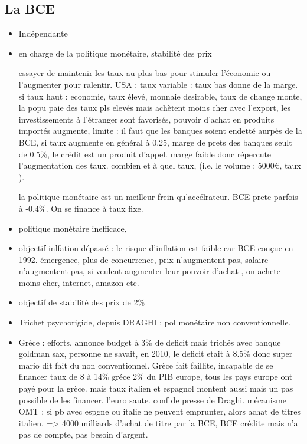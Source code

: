 \documentclass[a4paper,12pt]{article}
\begin{document}
\subsection{La BCE}

\begin{itemize}
	\item Indépendante
	\item en charge de la politique monétaire, stabilité des prix
	
	essayer de maintenir les taux au plus bas pour stimuler l'économie
	ou l'augmenter pour ralentir.
	USA : taux variable : taux bas donne de la marge.
	si taux haut : economie, taux élevé, monnaie desirable, taux de change monte,
	la popu paie des taux pls elevés mais achètent moins cher avec l'export, 
	les investissements à l'étranger sont favorisés, pouvoir d'achat en produits importés augmente,
	limite : il faut que les banques soient endetté aurpès de la BCE, si taux augmente en général à 0.25,
	marge de prets des banques seult de 0.5\%, le crédit est un produit d'appel. marge faible donc répercute
	l'augmentation des taux. combien et à quel taux, (i.e. le volume : 5000€, taux ).
	
	la politique monétaire est un meilleur frein qu'accélrateur. BCE prete parfois à -0.4\%.
	On se finance à taux fixe. 
	
	\item politique monétaire inefficace, 
	\item objectif inlfation dépassé : le risque d'inflation est faible car BCE conçue en 1992.
	émergence, plus de concurrence, prix n'augmentent pas, salaire n'augmentent pas, 
	si veulent augmenter leur pouvoir d'achat , on achete moins cher, internet, amazon etc.
	
	\item objectif de stabilité des prix de 2\%
	
	\item Trichet psychorigide, depuis DRAGHI ; pol monétaire non conventionnelle.
	
	\item Grèce : efforts, annonce budget à 3\% de deficit mais trichés avec banque goldman sax,
	personne ne savait, en 2010, le deficit etait à 8.5\%
	donc super mario dit fait du non conventionnel.
	Grèce fait faillite, incapable de se financer taux de 8 à 14\%
	gréce 2\% du PIB europe, tous les pays europe ont payé pour la grèce.
	mais taux italien et espagnol montent aussi mais un pas possible de les financer.
	l'euro saute. conf de presse de Draghi.
	mécanisme OMT : si pb avec espgne ou italie ne peuvent emprunter, alors achat de titres italien.
	=> 4000 milliards d'achat de titre par la BCE, BCE crédite mais n'a pas de compte, pas besoin d'argent.
	

\end{itemize}
\end{document}
